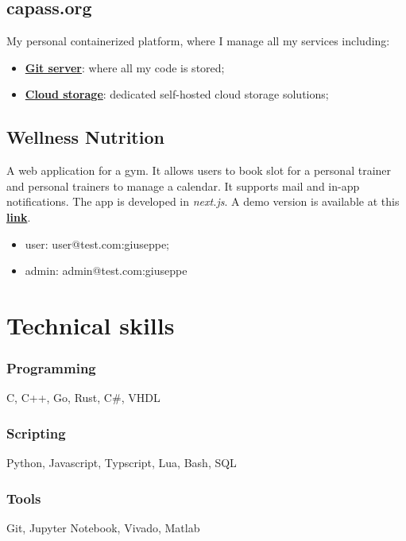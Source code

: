 \documentclass[11pt,a4paper]{article}
\begin{document}
  \subsection{capass.org}
  My personal containerized platform, where I manage all my services including:
  \begin{itemize}
    \item \href{https://git.capass.org}{\textbf{Git server}}: where all my code is stored;
    \item \href{https://cloud.capass.org}{\textbf{Cloud storage}}: dedicated self-hosted cloud storage solutions;
  \end{itemize}

  \subsection{Wellness Nutrition}
  A web application for a gym. It allows users to book slot for a personal trainer and personal trainers to manage a calendar. It supports mail and in-app notifications. The app is developed in  \textit{next.js}. A demo version is available at this \href{https://wellness-nutrition.vercel.app}{\textbf{link}}.\\
\begin{itemize}
  \item user: user@test.com:giuseppe;
  \item admin: admin@test.com:giuseppe
\end{itemize}

  \section{Technical skills}
  \subsubsection{Programming}
  C, C++, Go, Rust, C\#, VHDL

  \subsubsection{Scripting}
  Python, Javascript, Typscript, Lua, Bash, SQL

  \subsubsection{Tools}
  Git, Jupyter Notebook, Vivado, Matlab
\end{document}
